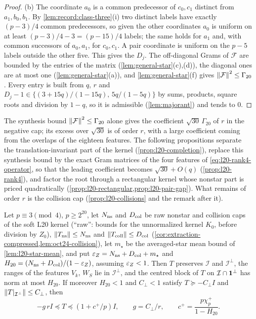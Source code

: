 \begin{proof}
(b) The coordinate $a_0$ is a common predecessor of $c_0,c_1$ distinct from
$a_1,b_0,b_1$. By \cref{lem:record:class-three}(i) two distinct labels have
exactly $(p-3)/4$ common predecessors, so given the other coordinates $a_0$ is
uniform on at least $(p-3)/4-3=(p-15)/4$ labels; the same holds for $a_1$ and,
with common successors of $a_0,a_1$, for $c_0,c_1$. A pair coordinate is
uniform on the $p-5$ labels outside the other five. This gives the $D_j$. The
off-diagonal Grams of $\mathcal F$ are bounded by the entries of the matrix
(\cref{lem:general-star}(c),(d)), the diagonal ones are at most one
(\cref{lem:general-star}(a)), and \cref{lem:general-star}(f) gives
$\left\|\mathcal F\right\|^2\le\Gamma_{20}$. Every entry is built from $q$, $r$ and
$D_j-1\in\{(3+15q)/(1-15q),\,5q/(1-5q)\}$ by sums, products, square roots and
division by $1-q$, so it is admissible (\cref{lem:majorant}) and tends to $0$.
\end{proof}

The synthesis bound $\left\|\mathcal F\right\|^2\le\Gamma_{20}$ alone
gives the coefficient $\sqrt{30}\,\Gamma_{20}$ of $r$ in the
negative cap; its excess over $\sqrt{30}$ is of order $r$, with a
large coefficient coming from the overlaps of the eighteen
features. The following propositions separate the
translation-invariant part of the kernel
(\cref{prop:l20-completion}), replace this synthesis bound by
the exact Gram matrices of the four
features of \eqref{eq:l20-rank4-operator}, so that the leading coefficient
becomes $\sqrt{30}+O(q)$ (\cref{prop:l20-rank4}), and factor the root through a
rectangular kernel whose nonstar part is priced quadratically
(\cref{prop:l20-rectangular,prop:l20-pair-gap}). What remains of order $r$ is the
collision cap (\cref{prop:l20-collisions} and the remark after it).

\begin{proposition}\label{prop:l20-completion}
Let $p\equiv3\pmod4$, $p\ge2^{20}$, let $N_{\rm ns}$ and $D_{\rm col}$ be raw nonstar
and collision caps of the soft L20 kernel (``raw'': bounds for the
unnormalized kernel $K_0$, before division by $Z_0$), $\left\|T_{\rm ns}\right\|\le N_{\rm ns}$
and $\left\|T_{\rm coll}\right\|\le D_{\rm col}$
(\cref{cor:extraction-compressed,lem:oct24-collision}), let $m_\star$ be the
averaged-star mean bound of \cref{lem:l20-star-mean}, and put
$\varepsilon_Z=N_{\rm ns}+D_{\rm col}+m_\star$ and
$H_{20}=(N_{\rm ns}+D_{\rm col})/(1-\varepsilon_Z)$, assuming $\varepsilon_Z<1$. Then $T$
preserves $\mathcal I$ and $\mathcal I^\perp$, the ranges of the features
$V_k$, $W_S$ lie in $\mathcal I^\perp$, and the centred block of $T$ on
$\mathcal I\cap\mathbf 1^\perp$ has norm at most $H_{20}$. If moreover $H_{20}<1$
and $C_\perp<1$ satisfy $T\succeq-C_\perp I$ and
$\left\|T|_{\mathcal I^\perp}\right\|\le C_\perp$, then
\begin{equation}\label{eq:l20-caps}
 -g\,rI\preceq T\preceq(1+c^+/p)I,\qquad g=C_\perp/r,\qquad
 c^+=\frac{p\chi^+_p}{1-H_{20}}.
\end{equation}
\end{proposition}

